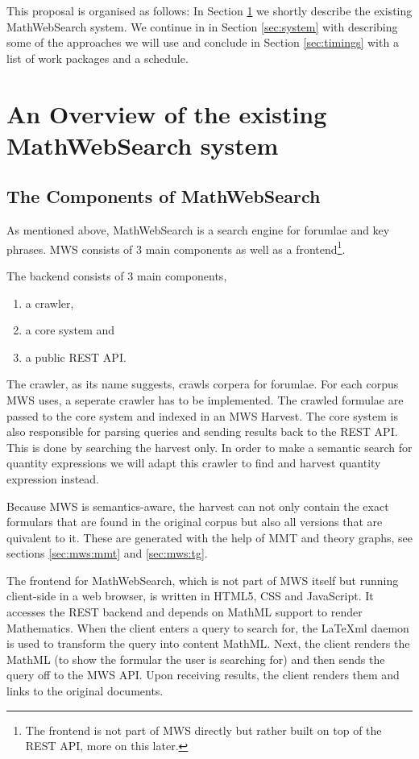 \documentclass[11pt]{article}
\begin{document}
This proposal is organised as follows: In Section \ref{sec:mws} we shortly describe the existing MathWebSearch system. We continue in in Section \ref{sec:system} with describing some of the approaches we will use and conclude in Section \ref{sec:timings} with a list of work packages and a schedule.

\section{An Overview of the existing MathWebSearch system}
\label{sec:mws}

\subsection{The Components of MathWebSearch}

As mentioned above, MathWebSearch is a search engine for forumlae and key phrases. MWS consists of 3 main components as well as a frontend\footnote{The frontend is not part of MWS directly but rather built on top of the REST API, more on this later. }\cite{KohPro:MWSmanual}.

The backend consists of 3 main components,
\begin{enumerate}
  \item a crawler,
  \item a core system and
  \item a public REST API.
\end{enumerate}

The crawler, as its name suggests, crawls corpera for forumlae. For each corpus MWS uses, a seperate crawler has to be implemented. The crawled formulae are passed to the core system and indexed in an MWS Harvest. The core system is also responsible for parsing queries and sending results back to the REST API. This is done by searching the harvest only. In order to make a semantic search for quantity expressions we will adapt this crawler to find and harvest quantity expression instead.

Because MWS is semantics-aware, the harvest can not only contain the exact formulars that are found in the original corpus but also all versions that are quivalent to it. These are generated with the help of MMT and theory graphs, see sections \ref{sec:mws:mmt} and \ref{sec:mws:tg}.

The frontend for MathWebSearch, which is not part of MWS itself but running client-side in a web browser, is written in HTML5, CSS and JavaScript. It accesses the REST backend and depends on MathML support to render Mathematics. When the client enters a query to search for, the \LaTeX{}ml daemon \cite{latexml-daemon} is used to transform the query into content MathML. Next, the client renders the MathML (to show the formular the user is searching for) and then sends the query off to the MWS API. Upon receiving results, the client renders them and links to the original documents.  
\end{document}
